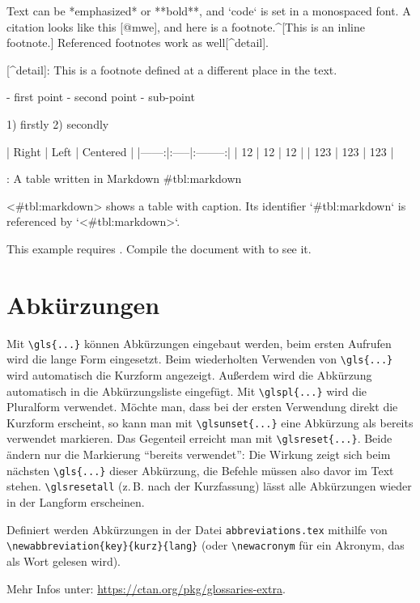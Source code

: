 \documentclass[../thesis-example]{subfiles}
\begin{document}
  \begin{ltgexample}
  \begin{markdown}
Text can be *emphasized* or **bold**, and `code` is set in a monospaced font.
A citation looks like this [@mwe], and here is a footnote.^[This is an inline footnote.]
Referenced footnotes work as well[^detail].

[^detail]: This is a footnote defined at a different place in the text.

- first point
- second point
  - sub-point

1) firstly
2) secondly

| Right | Left | Centered |
|------:|:-----|:--------:|
|    12 | 12   |    12    |
|   123 | 123  |   123    |

: A table written in Markdown {#tbl:markdown}

<#tbl:markdown> shows a table with caption.
Its identifier `{#tbl:markdown}` is referenced by `<#tbl:markdown>`.
\end{markdown}
  \end{ltgexample}
\else
  This example requires .
  Compile the document with  to see it.
\fi

\section{Abkürzungen}

Mit \verb+\gls{...}+ können Abkürzungen eingebaut werden, beim ersten Aufrufen wird die lange Form eingesetzt.
Beim wiederholten Verwenden von \verb+\gls{...}+ wird automatisch die Kurzform angezeigt.
Außerdem wird die Abkürzung automatisch in die Abkürzungsliste eingefügt.
Mit \verb+\glspl{...}+ wird die Pluralform verwendet.
Möchte man, dass bei der ersten Verwendung direkt die Kurzform erscheint, so kann man mit \verb+\glsunset{...}+ eine Abkürzung als bereits verwendet markieren.
Das Gegenteil erreicht man mit \verb+\glsreset{...}+.
Beide ändern nur die Markierung \enquote{bereits verwendet}: Die Wirkung zeigt sich beim nächsten \verb+\gls{...}+ dieser Abkürzung, die Befehle müssen also davor im Text stehen.
\verb+\glsresetall+ (z.\,B. nach der Kurzfassung) lässt alle Abkürzungen wieder in der Langform erscheinen.

Definiert werden Abkürzungen in der Datei \verb+abbreviations.tex+ mithilfe von \verb+\newabbreviation{key}{kurz}{lang}+ (oder \verb+\newacronym+ für ein Akronym, das als Wort gelesen wird).

Mehr Infos unter: \url{https://ctan.org/pkg/glossaries-extra}.
\end{document}
